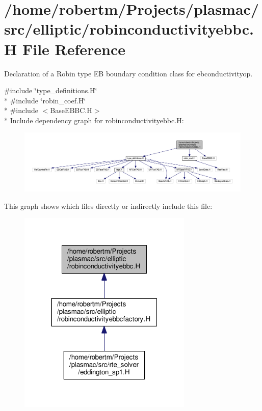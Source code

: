 \hypertarget{robinconductivityebbc_8H}{}\section{/home/robertm/\+Projects/plasmac/src/elliptic/robinconductivityebbc.H File Reference}
\label{robinconductivityebbc_8H}


Declaration of a Robin type EB boundary condition class for ebconductivityop.  


{\ttfamily \#include \char`\"{}type\+\_\+definitions.\+H\char`\"{}}\\*
{\ttfamily \#include \char`\"{}robin\+\_\+coef.\+H\char`\"{}}\\*
{\ttfamily \#include $<$Base\+E\+B\+B\+C.\+H$>$}\\*
Include dependency graph for robinconductivityebbc.\+H\+:\nopagebreak
\begin{figure}[H]
\begin{center}
\leavevmode
\includegraphics[width=350pt]{robinconductivityebbc_8H__incl}
\end{center}
\end{figure}
This graph shows which files directly or indirectly include this file\+:\nopagebreak
\begin{figure}[H]
\begin{center}
\leavevmode
\includegraphics[width=235pt]{robinconductivityebbc_8H__dep__incl}
\end{center}
\end{figure}
